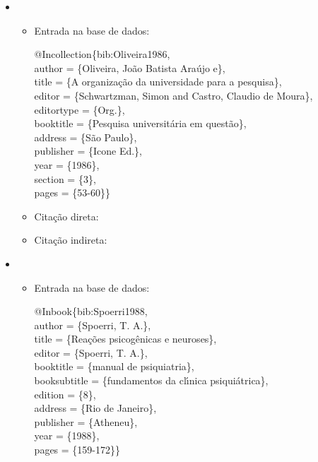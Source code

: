 \documentclass[a4paper,12pt,oneside,onecolumn]{uerj}
\newcommand{\formato}[1]{\begin{flushleft}{#1}\end{flushleft}}
\begin{document}
\begin{itemize}[label={Ex.:},leftmargin=\parindent,parsep=0pt,itemsep=0pt]
  \item \formato{\citetext{bib:Oliveira1986}}

  \begin{itemize}[leftmargin=*,parsep=0pt,itemsep=0pt]
    \item Entrada na base de dados:

    \formato{
      @Incollection\{bib:Oliveira1986,\\
        author = \{Oliveira, Jo{\~a}o Batista Ara{\'u}jo e\},\\
        title = \{A organização da universidade para a pesquisa\},\\
        editor = \{Schwartzman, Simon and Castro, Claudio de Moura\},\\
        editortype = \{Org.\},\\
        booktitle = \{Pesquisa universit{\'a}ria em quest{\~a}o\},\\
        address = \{S{\~a}o Paulo\},\\
        publisher = \{Icone Ed.\},\\
        year = \{1986\},\\
        section = \{3\},\\
        pages = \{53-60\}\}\\
    }

    \item Citação direta: 
    \item Citação indireta: \cite{bib:Oliveira1986}\\
  \end{itemize}

  \item \formato{\citetext{bib:Spoerri1988}}

  \begin{itemize}[leftmargin=*,parsep=0pt,itemsep=0pt]
    \item Entrada na base de dados:

    \formato{
      @Inbook\{bib:Spoerri1988,\\
        author = \{Spoerri, T. A.\},\\
        title = \{Rea{\c c}{\~o}es psicog{\^e}nicas e neuroses\},\\
        editor = \{Spoerri, T. A.\},\\
        booktitle = \{manual de psiquiatria\},\\
        booksubtitle = \{fundamentos da cl{\'\i}nica psiqui{\'a}trica\},\\
        edition = \{8\},\\
        address = \{Rio de Janeiro\},\\
        publisher = \{Atheneu\},\\
        year = \{1988\},\\
        pages = \{159-172\}\}\\
    }


\end{itemize}
\end{itemize}
\end{document}
